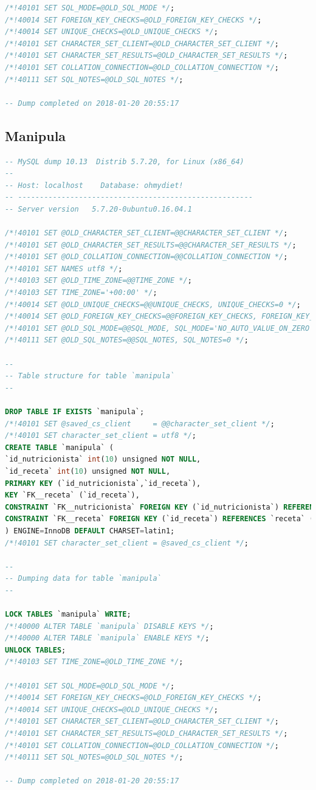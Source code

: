 \documentclass[12pt,letterpaper]{article}
\begin{document}
\begin{lstlisting}[language=sql]
/*!40101 SET SQL_MODE=@OLD_SQL_MODE */;
/*!40014 SET FOREIGN_KEY_CHECKS=@OLD_FOREIGN_KEY_CHECKS */;
/*!40014 SET UNIQUE_CHECKS=@OLD_UNIQUE_CHECKS */;
/*!40101 SET CHARACTER_SET_CLIENT=@OLD_CHARACTER_SET_CLIENT */;
/*!40101 SET CHARACTER_SET_RESULTS=@OLD_CHARACTER_SET_RESULTS */;
/*!40101 SET COLLATION_CONNECTION=@OLD_COLLATION_CONNECTION */;
/*!40111 SET SQL_NOTES=@OLD_SQL_NOTES */;

-- Dump completed on 2018-01-20 20:55:17

\end{lstlisting}
\subsection{Manipula}
\begin{lstlisting}[language=sql]
-- MySQL dump 10.13  Distrib 5.7.20, for Linux (x86_64)
--
-- Host: localhost    Database: ohmydiet!
-- ------------------------------------------------------
-- Server version	5.7.20-0ubuntu0.16.04.1

/*!40101 SET @OLD_CHARACTER_SET_CLIENT=@@CHARACTER_SET_CLIENT */;
/*!40101 SET @OLD_CHARACTER_SET_RESULTS=@@CHARACTER_SET_RESULTS */;
/*!40101 SET @OLD_COLLATION_CONNECTION=@@COLLATION_CONNECTION */;
/*!40101 SET NAMES utf8 */;
/*!40103 SET @OLD_TIME_ZONE=@@TIME_ZONE */;
/*!40103 SET TIME_ZONE='+00:00' */;
/*!40014 SET @OLD_UNIQUE_CHECKS=@@UNIQUE_CHECKS, UNIQUE_CHECKS=0 */;
/*!40014 SET @OLD_FOREIGN_KEY_CHECKS=@@FOREIGN_KEY_CHECKS, FOREIGN_KEY_CHECKS=0 */;
/*!40101 SET @OLD_SQL_MODE=@@SQL_MODE, SQL_MODE='NO_AUTO_VALUE_ON_ZERO' */;
/*!40111 SET @OLD_SQL_NOTES=@@SQL_NOTES, SQL_NOTES=0 */;

--
-- Table structure for table `manipula`
--

DROP TABLE IF EXISTS `manipula`;
/*!40101 SET @saved_cs_client     = @@character_set_client */;
/*!40101 SET character_set_client = utf8 */;
CREATE TABLE `manipula` (
`id_nutricionista` int(10) unsigned NOT NULL,
`id_receta` int(10) unsigned NOT NULL,
PRIMARY KEY (`id_nutricionista`,`id_receta`),
KEY `FK__receta` (`id_receta`),
CONSTRAINT `FK__nutricionista` FOREIGN KEY (`id_nutricionista`) REFERENCES `nutricionista` (`id_nutricionista`),
CONSTRAINT `FK__receta` FOREIGN KEY (`id_receta`) REFERENCES `receta` (`id_receta`)
) ENGINE=InnoDB DEFAULT CHARSET=latin1;
/*!40101 SET character_set_client = @saved_cs_client */;

--
-- Dumping data for table `manipula`
--

LOCK TABLES `manipula` WRITE;
/*!40000 ALTER TABLE `manipula` DISABLE KEYS */;
/*!40000 ALTER TABLE `manipula` ENABLE KEYS */;
UNLOCK TABLES;
/*!40103 SET TIME_ZONE=@OLD_TIME_ZONE */;

/*!40101 SET SQL_MODE=@OLD_SQL_MODE */;
/*!40014 SET FOREIGN_KEY_CHECKS=@OLD_FOREIGN_KEY_CHECKS */;
/*!40014 SET UNIQUE_CHECKS=@OLD_UNIQUE_CHECKS */;
/*!40101 SET CHARACTER_SET_CLIENT=@OLD_CHARACTER_SET_CLIENT */;
/*!40101 SET CHARACTER_SET_RESULTS=@OLD_CHARACTER_SET_RESULTS */;
/*!40101 SET COLLATION_CONNECTION=@OLD_COLLATION_CONNECTION */;
/*!40111 SET SQL_NOTES=@OLD_SQL_NOTES */;

-- Dump completed on 2018-01-20 20:55:17

\end{lstlisting}
\end{document}
